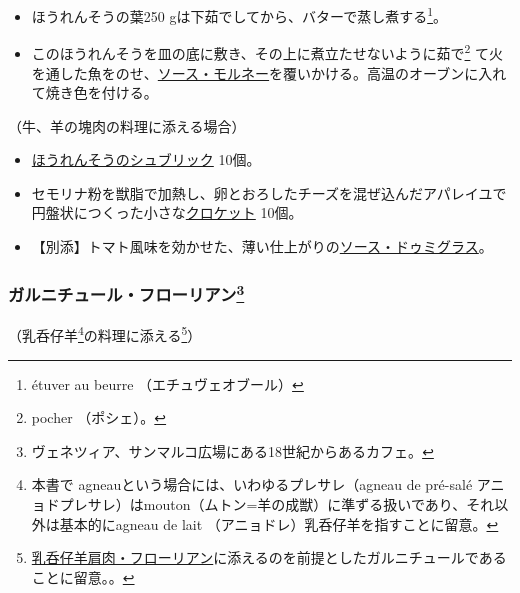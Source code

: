 \begin{recette}
\begin{itemize}
\item
  ほうれんそうの葉250 gは下茹でしてから、バターで蒸し煮する\footnote{étuver
    au beurre （エチュヴェオブール）}。
\item
  このほうれんそうを皿の底に敷き、その上に煮立たせないように茹で\footnote{pocher
    （ポシェ）。}
  て火を通した魚をのせ、\protect\hyperlink{sauce-mornay}{ソース・モルネー}を覆いかける。高温のオーブンに入れて焼き色を付ける。
\end{itemize}

（牛、羊の塊肉の料理に添える場合）

\begin{itemize}
\item
  \protect\hyperlink{sucric-d-epinards}{ほうれんそうのシュブリック}
  10個。
\item
  セモリナ粉を獣脂で加熱し、卵とおろしたチーズを混ぜ込んだアパレイユで円盤状につくった小さな\protect\hyperlink{croquettes}{クロケット}
  10個。
\item
  【別添】トマト風味を効かせた、薄い仕上がりの\protect\hyperlink{sauce-demi-glace}{ソース・ドゥミグラス}。
\end{itemize}

\atoaki{}

\hypertarget{garniture-Florian}{%
\subsubsection[ガルニチュール・フローリアン]{\texorpdfstring{ガルニチュール・フローリアン\footnote{ヴェネツィア、サンマルコ広場にある18世紀からあるカフェ。}}{ガルニチュール・フローリアン}}\label{garniture-Florian}}



（乳呑仔羊\footnote{本書で
  agneauという場合には、いわゆるプレサレ（agneau de pré-salé
  アニョドプレサレ）はmouton（ムトン=羊の成獣）に準ずる扱いであり、それ以外は基本的にagneau
  de lait （アニョドレ）乳呑仔羊を指すことに留意。}の料理に添える\footnote{\protect\hyperlink{epaule-d-agneau-florian}{乳呑仔羊肩肉・フローリアン}に添えるのを前提としたガルニチュールであることに留意。。}）


\end{recette}
